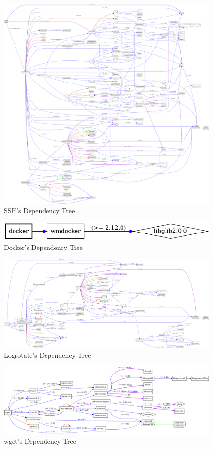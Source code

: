 \begin{figure}[H]
    \centering
    \includegraphics[width=\textwidth]{images/deps/ssh.png}
    \caption{SSH's Dependency Tree}
    \label{app:fig:ssh_dep_tree}
\end{figure}

\begin{figure}[H]
    \centering
    \includegraphics[width=\textwidth]{images/deps/docker.png}
    \caption{Docker's Dependency Tree}
    \label{app:fig:docker_dep_tree}
\end{figure}

\begin{figure}[H]
    \centering
    \includegraphics[width=\textwidth]{images/deps/logrotate.png}
    \caption{Logrotate's Dependency Tree}
    \label{app:fig:logrotate_dep_tree}
\end{figure}

\begin{figure}[H]
    \centering
    \includegraphics[width=\textwidth]{images/deps/wget.png}
    \caption{wget's Dependency Tree}
    \label{app:fig:wget_dep_tree}
\end{figure}
